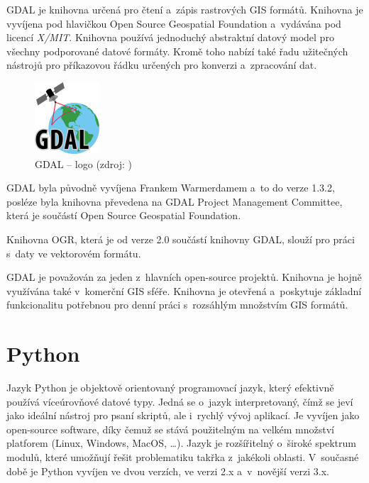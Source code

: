 \documentclass[a4paper,12pt,oneside]{book}
\begin{document}
GDAL je knihovna určená pro čtení a~zápis rastrových GIS
formátů. Knihovna je vyvíjena pod hlavičkou Open Source Geospatial
Foundation a~vydávána pod licencí \textit{X/MIT}. Knihovna používá
jednoduchý abstraktní datový model pro všechny podporované datové
formáty. Kromě toho nabízí také řadu užitečných nástrojů pro
příkazovou řádku určených pro konverzi a~zpracování
dat.

\begin{figure}[h]
\centering
\includegraphics[scale=.9]{images/gdal-logo.png}
\caption[GDAL -- logo]{GDAL -- logo (zdroj: \cite{gdal})}
\end{figure}

GDAL byla původně vyvíjena Frankem Warmerdamem a~to do verze 1.3.2,
posléze byla knihovna převedena na GDAL Project Management Committee,
která je součástí Open Source Geospatial Foundation.

Knihovna OGR, která je od verze 2.0 součástí knihovny GDAL, slouží pro
práci s~daty ve vektorovém formátu.

GDAL je považován za jeden z~hlavních open-source projektů. Knihovna
je hojně využívána také v~komerční GIS sféře. Knihovna je otevřená
a~poskytuje základní funkcionalitu potřebnou pro denní práci
s~rozsáhlým množstvím GIS formátů.\cite{gdal_wiki} \cite{gdal} 
\cite{book_opensourcetools}


\section{Python}

Jazyk Python je objektově orientovaný programovací jazyk, který
efektivně používá víceúrovňové datové typy. Jedná se o~jazyk
interpretovaný, čímž se jeví jako ideální nástroj pro psaní skriptů,
ale i~rychlý vývoj aplikací. Je vyvíjen jako open-source software,
díky čemuž se stává použitelným na velkém množství platforem (Linux,
Windows, MacOS, \dots). Jazyk je rozšířitelný o~široké spektrum
modulů, které umožňují řešit problematiku takřka z~jakékoli
oblasti. V~současné době je Python vyvíjen ve dvou verzích, ve verzi
2.x a~v~novější verzi 3.x.  \cite{dive_into_python} \cite{python_web}
\end{document}
